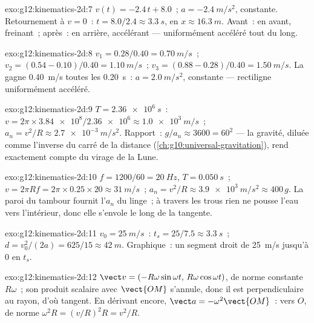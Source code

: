 \begin{solution}{exo:g12:kinematics-2d:7}
$v(t) = -2.4\,t + 8.0$~; $a = \qty{-2.4}{m/s^2}$, constante.
Retournement à $v = 0$~: $t = 8.0/2.4 \approx \qty{3.3}{s}$, en
$x \approx \qty{16.3}{m}$. Avant~: en avant, freinant~; après~: en
arrière, accélérant --- uniformément accéléré tout du long.
\end{solution}

\begin{solution}{exo:g12:kinematics-2d:8}
$v_1 = 0.28/0.40 = \qty{0.70}{m/s}$~;
$v_2 = (0.54 - 0.10)/0.40 = \qty{1.10}{m/s}$~;
$v_3 = (0.88 - 0.28)/0.40 = \qty{1.50}{m/s}$. La  gagne
\qty{0.40}{m/s} toutes les \qty{0.20}{s}~: $a = \qty{2.0}{m/s^2}$,
constante --- rectiligne uniformément accéléré.
\end{solution}

\begin{solution}{exo:g12:kinematics-2d:9}
$T = \qty{2.36e6}{s}$~: $v = 2\pi \times \num{3.84e8}/\num{2.36e6}
\approx \qty{1.0e3}{m/s}$~;
$a_n = v^2/R \approx \qty{2.7e-3}{m/s^2}$. Rapport~:
$g/a_n \approx 3600 = 60^2$ --- la gravité, diluée comme l'inverse du
carré de la distance (\cref{ch:g10:universal-gravitation}), rend
exactement compte du virage de la Lune.
\end{solution}

\begin{solution}{exo:g12:kinematics-2d:10}
$f = 1200/60 = \qty{20}{Hz}$, $T = \qty{0.050}{s}$~;
$v = 2\pi R f = 2\pi \times 0.25 \times 20 \approx \qty{31}{m/s}$~;
$a_n = v^2/R \approx \qty{3.9e3}{m/s^2} \approx 400\,g$. La paroi du
tambour fournit l'$a_n$ du linge~; à travers les trous rien ne pousse
l'eau vers l'intérieur, donc elle s'envole le long de la tangente.
\end{solution}

\begin{solution}{exo:g12:kinematics-2d:11}
$v_0 = \qty{25}{m/s}$~: $t_s = 25/7.5 \approx \qty{3.3}{s}$~;
$d = v_0^2/(2a) = 625/15 \approx \qty{42}{m}$. Graphique~: un segment
droit de \qty{25}{m/s} jusqu'à $0$ en $t_s$.
\end{solution}

\begin{solution}{exo:g12:kinematics-2d:12}
$\vect v = (-R\omega\sin\omega t,\, R\omega\cos\omega t)$, de
norme constante $R\omega$~; son produit scalaire avec $\vect{OM}$
s'annule, donc il est perpendiculaire au rayon, d'où tangent. En
dérivant encore, $\vect a = -\omega^2\vect{OM}$~: vers $O$, de norme
$\omega^2 R = (v/R)^2 R = v^2/R$.
\end{solution}


